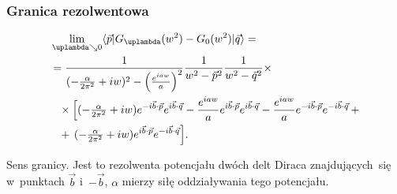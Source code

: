 \documentclass[10pt,t]{beamer}
\begin{document}
\begin{frame}
  \frametitle{Granica rezolwentowa}


  \begin{equation}
    \label{eq:Efekt-Casimira-34}
    \begin{split}
      &\lim_{ \lambda \searrow 0 }\langle \vecp | G_{ \lambda }( w^{ 2 } ) - G_{ 0 }( w^{ 2 } )
        | \vecq \rangle
        = \\
      &= \frac{ 1 }{ ( -\tfrac{ \alpha } { 2 \pi^{ 2 } } + iw )^{ 2 }
        - \left( \tfrac{ e^{ i aw } }{ a } \right)^{ 2 } }
        \frac{ 1 }{ w^{ 2 } - \vecp^{ 2 } }
        \frac{ 1 }{ w^{ 2 } - \vecq^{ 2 } } \times \\
      &\hphantom{=}
        \times \Big[ ( -\tfrac{ \alpha }{ 2 \pi^{ 2 } } + i w ) e^{ -i \vecb \cdot \vecp }
        e^{ i \vecb \cdot \vecq }
        - \frac{ e^{ i aw } }{ a } e^{ i \vecb \cdot \vecp }
        e^{ i \vecb \cdot \vecq } -\frac{ e^{ i aw } }{ a } e^{ -i \vecb \cdot \vecp }
        e^{ -i \vecb \cdot \vecq } \, + \\
      &\hphantom{=}
        + \, ( -\tfrac{ \alpha }{ 2 \pi^{ 2 } } + i w ) e^{ i \vecb \cdot \vecp }
        e^{ -i \vecb \cdot \vecq } \Big].
    \end{split}
  \end{equation}

  Sens granicy. Jest to rezolwenta potencjału dwóch delt Diraca
  znajdujących~się w~punktach $\vec{ b }$ i~$-\vec{ b }$, $\alpha$ mierzy siłę
  oddziaływania tego potencjału.

\end{frame}
\end{document}
